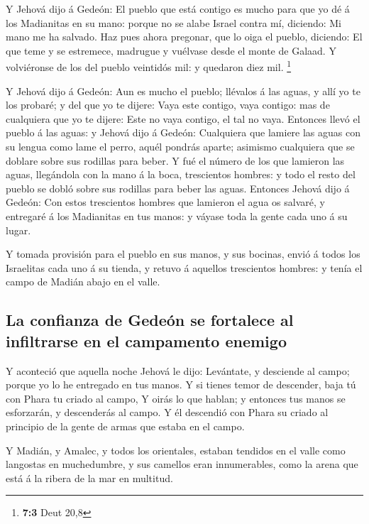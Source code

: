  Y Jehová dijo á Gedeón: El pueblo que está contigo es mucho
para que yo dé á los Madianitas en su mano: porque no se alabe Israel
contra mí, diciendo: Mi mano me ha salvado.  Haz pues ahora
pregonar, que lo oiga el pueblo, diciendo: El que teme y se estremece,
madrugue y vuélvase desde el monte de Galaad. Y volviéronse de los del
pueblo veintidós mil: y quedaron diez mil. \footnote{\textbf{7:3} Deut
  20,8}

 Y Jehová dijo á Gedeón: Aun es mucho el pueblo; llévalos á
las aguas, y allí yo te los probaré; y del que yo te dijere: Vaya este
contigo, vaya contigo: mas de cualquiera que yo te dijere: Este no vaya
contigo, el tal no vaya.  Entonces llevó el pueblo á las
aguas: y Jehová dijo á Gedeón: Cualquiera que lamiere las aguas con su
lengua como lame el perro, aquél pondrás aparte; asimismo cualquiera que
se doblare sobre sus rodillas para beber.  Y fué el número
de los que lamieron las aguas, llegándola con la mano á la boca,
trescientos hombres: y todo el resto del pueblo se dobló sobre sus
rodillas para beber las aguas.  Entonces Jehová dijo á
Gedeón: Con estos trescientos hombres que lamieron el agua os salvaré, y
entregaré á los Madianitas en tus manos: y váyase toda la gente cada uno
á su lugar.

 Y tomada provisión para el pueblo en sus manos, y sus
bocinas, envió á todos los Israelitas cada uno á su tienda, y retuvo á
aquellos trescientos hombres: y tenía el campo de Madián abajo en el
valle.

\hypertarget{la-confianza-de-gedeuxf3n-se-fortalece-al-infiltrarse-en-el-campamento-enemigo}{%
\subsection{La confianza de Gedeón se fortalece al infiltrarse en el
campamento
enemigo}\label{la-confianza-de-gedeuxf3n-se-fortalece-al-infiltrarse-en-el-campamento-enemigo}}

 Y aconteció que aquella noche Jehová le dijo: Levántate, y
desciende al campo; porque yo lo he entregado en tus manos.
 Y si tienes temor de descender, baja tú con Phara tu
criado al campo,  Y oirás lo que hablan; y entonces tus
manos se esforzarán, y descenderás al campo. Y él descendió con Phara su
criado al principio de la gente de armas que estaba en el campo.

 Y Madián, y Amalec, y todos los orientales, estaban
tendidos en el valle como langostas en muchedumbre, y sus camellos eran
innumerables, como la arena que está á la ribera de la mar en multitud.

